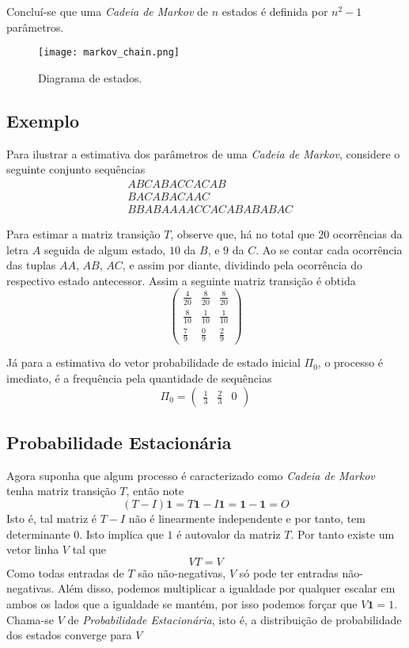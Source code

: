 \documentclass{subfiles}
\begin{document}
Concluí-se que uma \textit{Cadeia de Markov} de $n$ estados é definida por $n^2-1$ parâmetros.

\begin{figure} %
	\texttt{[image: markov\_chain.png]}
	\caption{Diagrama de estados.}
	\label{fig:auto_rep}
\end{figure}

\subsection{Exemplo} \label{sub:exemplo}

Para ilustrar a estimativa dos parâmetros de uma \textit{Cadeia de Markov}, considere o seguinte conjunto sequências
\begin{align*}
	&ABCABACCACAB         \\
	&BACABACAAC           \\
	&BBABAAAACCACABABABAC
\end{align*}

Para estimar a matriz transição $T$, observe que, há no total que $20$ ocorrências da letra $A$ seguida de algum estado, $10$ da $B$, e $9$ da $C$. Ao se contar cada ocorrência das tuplas $AA$, $AB$, $AC$, e assim por diante, dividindo pela ocorrência do respectivo estado antecessor. Assim a seguinte matriz transição é obtida
\[
    \begin{pmatrix}
        \frac{4}{20} & \frac{8}{20} & \frac{8}{20} \\
        \frac{8}{10} & \frac{1}{10} & \frac{1}{10} \\
        \frac{7}{9} & \frac{0}{9} & \frac{2}{9}
    \end{pmatrix}
\]

Já para a estimativa do vetor probabilidade de estado inicial $\Pi_0$, o processo é imediato, é a frequência pela quantidade de sequências
\[
	\Pi_0 = \begin{pmatrix}
		\frac{1}{3} & \frac{2}{3} & 0
	\end{pmatrix}
\]

\subsection{Probabilidade Estacionária}

Agora suponha que algum processo é caracterizado como \textit{Cadeia de Markov} tenha matriz transição $T$, então note
\[
	(T - I)\mathbf{1} = T\mathbf{1} - I\mathbf{1} = \mathbf{1} - \mathbf{1} = O
\]
Isto é, tal matriz é $T - I$ não é linearmente independente e por tanto, tem determinante $0$. Isto implica que $1$ é autovalor da matriz $T$. Por tanto existe um vetor linha $V$ tal que
\[
	VT = V
\]
Como todas entradas de $T$ são não-negativas, $V$ só pode ter entradas não-negativas. Além disso, podemos multiplicar a igualdade por qualquer escalar em ambos os lados que a igualdade se mantém, por isso podemos forçar que $V\mathbf{1} = 1$. Chama-se $V$ de \textit{Probabilidade Estacionária}, isto é, a distribuição de probabilidade dos estados converge para $V$
\end{document}
